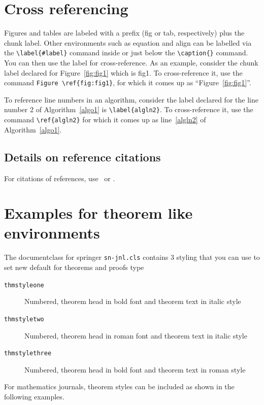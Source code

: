 \documentclass[sn-basic,pdflatex]{sn-jnl}
\theoremstyle{remark}
\theoremstyle{definition}
\begin{document}
\section{Cross referencing}\label{sec8}

Figures and tables are labeled with a prefix (fig or tab, respectively)
plus the chunk label. Other environments such as equation and align can
be labelled via the \texttt{\textbackslash{}label\{\#label\}} command
inside or just below the \texttt{\textbackslash{}caption\{\}} command.
You can then use the label for cross-reference. As an example, consider
the chunk label declared for Figure~\ref{fig:fig1} which is fig1. To
cross-reference it, use the command
\texttt{Figure\ \textbackslash{}ref\{fig:fig1\}}, for which it comes up
as ``Figure~\ref{fig:fig1}''.

To reference line numbers in an algorithm, consider the label declared
for the line number 2 of Algorithm~\ref{algo1} is
\texttt{\textbackslash{}label\{algln2\}}. To cross-reference it, use the
command \texttt{\textbackslash{}ref\{algln2\}} for which it comes up as
line~\ref{algln2} of Algorithm~\ref{algo1}.

\subsection{Details on reference citations}\label{subsec7}

For citations of references, use~\citet{bib1} or \citep{bib2}.

\section{Examples for theorem like environments}\label{sec10}

The documentclass for springer \texttt{sn-jnl.cls} contains 3 styling
that you can use to set new default for theorems and proofs type

\begin{description}
\item[\texttt{thmstyleone}]
Numbered, theorem head in bold font and theorem text in italic style
\item[\texttt{thmstyletwo}]
Numbered, theorem head in roman font and theorem text in italic style
\item[\texttt{thmstylethree}]
Numbered, theorem head in bold font and theorem text in roman style
\end{description}

For mathematics journals, theorem styles can be included as shown in the
following examples.
\end{document}
